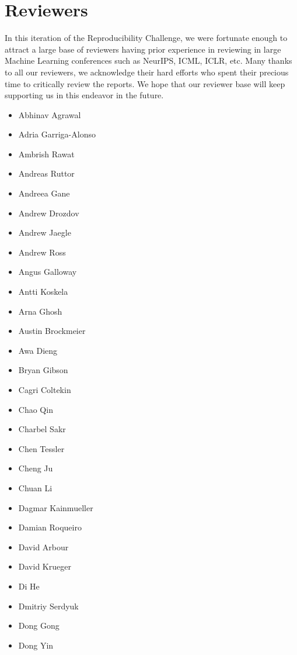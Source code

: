 \section{Reviewers}

In this iteration of the Reproducibility Challenge, we were fortunate enough to attract a large base of reviewers having prior experience in reviewing in large Machine Learning conferences such as NeurIPS, ICML, ICLR, etc. Many thanks to all our reviewers, we acknowledge their hard efforts who spent their precious time to critically review the reports. We hope that our reviewer base will keep supporting us in this endeavor in the future.

\begingroup
\fontsize{8pt}{7pt}\selectfont
\begin{multicols}{4}
\begin{itemize}[label={}]
    \item Abhinav Agrawal
    \item Adria Garriga-Alonso
    \item Ambrish Rawat
    \item Andreas Ruttor
    \item Andreea Gane
    \item Andrew Drozdov
    \item Andrew Jaegle
    \item Andrew Ross
    \item Angus Galloway
    \item Antti Koskela
    \item Arna Ghosh
    \item Austin Brockmeier
    \item Awa Dieng
    \item Bryan Gibson
    \item Cagri Coltekin
    \item Chao Qin
    \item Charbel Sakr
    \item Chen Tessler
    \item Cheng Ju
    \item Chuan Li
    \item Dagmar Kainmueller
    \item Damian Roqueiro
    \item David Arbour
    \item David Krueger
    \item Di He
    \item Dmitriy Serdyuk
    \item Dong Gong
    \item Dong Yin

\end{itemize}
\end{multicols}
